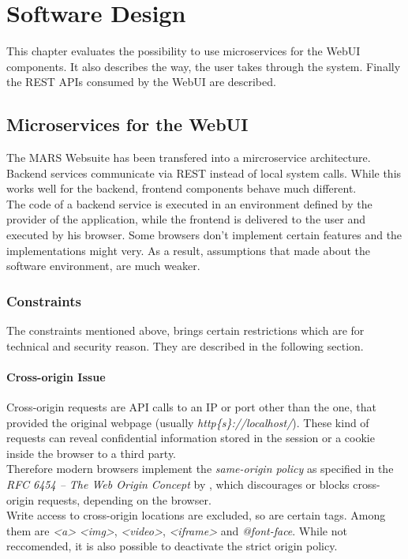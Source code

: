 
\chapter{Software Design}
This chapter evaluates the possibility to use microservices for the WebUI components. It also describes the way, the user takes through the system. Finally the REST APIs consumed by the WebUI are described.



\section{Microservices for the WebUI}
\label{sec:MS_for_WebUI}
The MARS Websuite has been transfered into a mircroservice architecture. Backend services communicate via REST instead of local system calls. While this works well for the backend, frontend components behave much different.\\
The code of a backend service is executed in an environment defined by the provider of the application, while the frontend is delivered to the user and executed by his browser. Some browsers don't implement certain features and the implementations might very. As a result, assumptions that made about the software environment, are much weaker. 


\subsection{Constraints}
The constraints mentioned above, brings certain restrictions which are for technical and security reason. They are described in the following section.

\subsubsection{Cross-origin Issue}
Cross-origin requests are API calls to an IP or port other than the one, that provided the original webpage (usually \textit{http\{s\}://localhost/}). These kind of requests can reveal confidential information stored in the session or a cookie inside the browser to a third party.\\
Therefore modern browsers implement the \textit{same-origin policy} as specified in the \textit{RFC 6454 -- The Web Origin Concept} by \cite{barth2011web}, which discourages or blocks cross-origin requests, depending on the browser.\\
Write access to cross-origin locations are excluded, so are certain tags. Among them are \textit{<a>} \textit{<img>}, \textit{<video>}, \textit{<iframe>} and \textit{@font-face}. While not reccomended, it is also possible to deactivate the strict origin policy.


